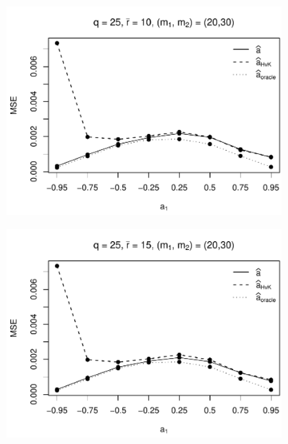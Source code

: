 \begin{figure}[h!]
\begin{subfigure}[b]{0.45\textwidth}
\includegraphics[width=\textwidth]{Plots/Robustness/MSE_a1_T=500_slope=1_(q,K1,K2,M1,M2)=(25,2,10,20,30).pdf}
\end{subfigure}
\hspace{0.25cm}
\begin{subfigure}[b]{0.45\textwidth}
\includegraphics[width=\textwidth]{Plots/Robustness/MSE_a1_T=500_slope=1_(q,K1,K2,M1,M2)=(25,2,15,20,30).pdf}
\end{subfigure}


\end{figure}
